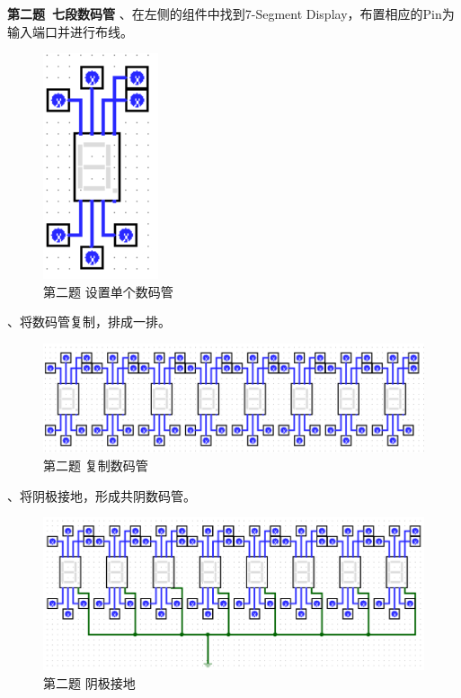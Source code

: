 \documentclass[UTF8]{ctexart}
\begin{document}
\newline
\textbf{第二题\ 七段数码管}
、在左侧的组件中找到7-Segment Display，布置相应的Pin为输入端口并进行布线。
\begin{figure}[h!]
    \centering
    \includegraphics[scale=0.6]{p2_s1.PNG}
    \caption{第二题 设置单个数码管}
\end{figure}
、将数码管复制，排成一排。
\begin{figure}[h!]
    \centering
    \includegraphics[scale=0.6]{p2_s2.PNG}
    \caption{第二题 复制数码管}
\end{figure}
、将阴极接地，形成共阴数码管。
\begin{figure}[h!]
    \centering
    \includegraphics[scale=0.6]{p2_s3.PNG}
    \caption{第二题 阴极接地}
\end{figure}
\newline
\end{document}
